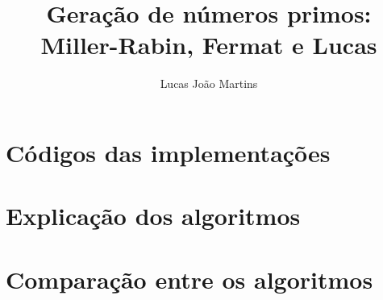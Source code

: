 \documentclass[12pt]{article}
\title{
  Geração de números primos: \\
  \large Miller-Rabin, Fermat e Lucas}
\author{Lucas João Martins}
\date{}
\begin{document}
\maketitle

\section{Códigos das implementações}






\section{Explicação dos algoritmos}

\section{Comparação entre os algoritmos}
\end{document}
